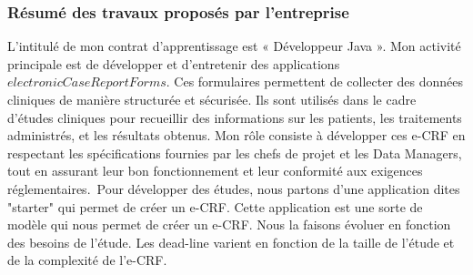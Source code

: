 \subsubsection{Résumé des travaux proposés par l'entreprise}
L'intitulé de mon contrat d'apprentissage est « Développeur Java ».
Mon activité principale est de développer et d’entretenir des applications
\(electronic Case Report Forms\). Ces formulaires permettent de collecter des données cliniques de manière structurée et sécurisée. Ils sont utilisés dans le cadre d'études cliniques pour recueillir des informations sur les patients, les traitements administrés, et les résultats obtenus. Mon rôle consiste à développer ces e-CRF en respectant les spécifications fournies par les chefs de projet et les Data Managers, tout en assurant leur bon fonctionnement et leur conformité aux exigences réglementaires.\
Pour développer des études, nous partons d'une application dites "starter" qui
permet de créer un e-CRF. Cette application est une sorte de modèle qui nous
permet de créer un e-CRF. Nous la faisons évoluer en fonction des
besoins de l'étude. Les dead-line varient en fonction de la taille de l'étude et de la
complexité de l'e-CRF. 
